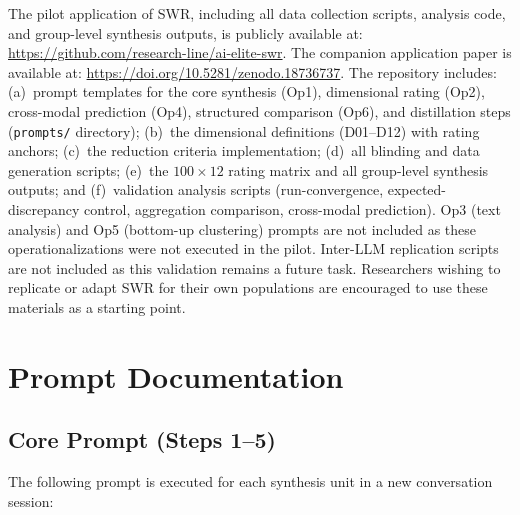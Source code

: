 \documentclass[11pt,a4paper]{article}
\theoremstyle{definition}
\theoremstyle{plain}
\theoremstyle{remark}
\begin{document}
\noindent The pilot application of SWR, including all data collection scripts, analysis code, and group-level synthesis outputs, is publicly available at: \url{https://github.com/research-line/ai-elite-swr}. The companion application paper is available at: \url{https://doi.org/10.5281/zenodo.18736737}. The repository includes: (a)~prompt templates for the core synthesis (Op1), dimensional rating (Op2), cross-modal prediction (Op4), structured comparison (Op6), and distillation steps (\texttt{prompts/} directory); (b)~the dimensional definitions (D01--D12) with rating anchors; (c)~the reduction criteria implementation; (d)~all blinding and data generation scripts; (e)~the $100 \times 12$ rating matrix and all group-level synthesis outputs; and (f)~validation analysis scripts (run-convergence, expected-discrepancy control, aggregation comparison, cross-modal prediction). Op3 (text analysis) and Op5 (bottom-up clustering) prompts are not included as these operationalizations were not executed in the pilot. Inter-LLM replication scripts are not included as this validation remains a future task. Researchers wishing to replicate or adapt SWR for their own populations are encouraged to use these materials as a starting point.

\newpage
\appendix

\section{Prompt Documentation}
\label{app:prompts}

\subsection{Core Prompt (Steps 1--5)}

The following prompt is executed for each synthesis unit in a new conversation session:
\end{document}

